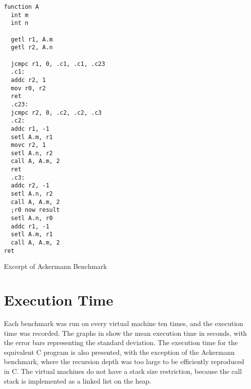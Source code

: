 	\begin{myfigure}
		\begin{lstlisting}
function A
  int m
  int n

  getl r1, A.m
  getl r2, A.n

  jcmpc r1, 0, .c1, .c1, .c23
  .c1:
  addc r2, 1
  mov r0, r2
  ret
  .c23:
  jcmpc r2, 0, .c2, .c2, .c3
  .c2:
  addc r1, -1
  setl A.m, r1
  movc r2, 1
  setl A.n, r2
  call A, A.m, 2
  ret
  .c3:
  addc r2, -1
  setl A.n, r2
  call A, A.m, 2
  ;r0 now result
  setl A.n, r0
  addc r1, -1
  setl A.m, r1
  call A, A.m, 2
ret
		\end{lstlisting}
		\caption{Excerpt of Ackermann Benchmark}
		\label{fig:ackermann}
	\end{myfigure}
	
	\section{Execution Time}
		Each benchmark was run on every virtual machine ten times, and the execution time was recorded. The graphs in  show the mean execution time in seconds, with the error bars representing the standard deviation. The execution time for the equivalent C program is also presented, with the exception of the Ackermann benchmark, where the recursion depth was too large to be efficiently reproduced in C. The virtual machines do not have a stack size restriction, because the call stack is implemented as a linked list on the heap.
	

